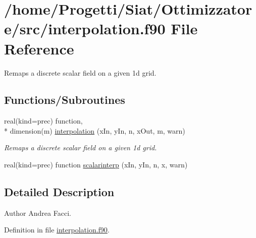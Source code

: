 \hypertarget{interpolation_8f90}{\section{/home/\-Progetti/\-Siat/\-Ottimizzatore/src/interpolation.f90 File Reference}
\label{interpolation_8f90}
}


Remaps a discrete scalar field on a given 1d grid.  


\subsection*{Functions/\-Subroutines}
\begin{DoxyCompactItemize}
\item 
real(kind=prec) function, \\*
dimension(m) \hyperlink{interpolation_8f90_af82151c6134b883711c2a1fa732ca69a}{interpolation} (x\-In, y\-In, n, x\-Out, m, warn)
\begin{DoxyCompactList}\small\item\em Remaps a discrete scalar field on a given 1d grid. \end{DoxyCompactList}\item 
real(kind=prec) function \hyperlink{interpolation_8f90_aad4c77c5bcdbd72c8d4ab3b3cb23585c}{scalarinterp} (x\-In, y\-In, n, x, warn)
\end{DoxyCompactItemize}


\subsection{Detailed Description}
\begin{DoxyAuthor}{Author}
Andrea Facci. 
\end{DoxyAuthor}


Definition in file \hyperlink{interpolation_8f90_source}{interpolation.\-f90}.



